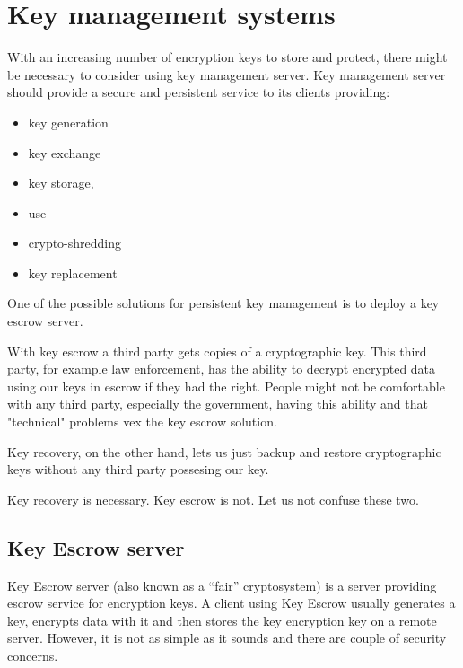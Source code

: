 \chapter{Key management systems}

With an increasing number of encryption keys to store and protect, there might be necessary to consider using key management server.
Key management server should provide a secure and persistent service to its clients providing:
\begin{itemize}
    \item key generation
    \item key exchange
    \item key storage,
    \item use
    \item crypto-shredding
    \item key replacement
\end{itemize}
One of the possible solutions for persistent key management is to deploy a key escrow server.

With key escrow a third party gets copies of a cryptographic key.
This third party, for example law enforcement, has the ability to decrypt encrypted data using our keys in escrow if they had the right.
People might not be comfortable with any third party, especially the government, having this ability and that "technical" problems vex the key escrow solution.


Key recovery, on the other hand, lets us just backup and restore cryptographic keys without any third party possesing our key.


Key recovery is necessary.
Key escrow is not.
Let us not confuse these two.

\section{Key Escrow server}\label{escrow}

Key Escrow server (also known as a “fair” cryptosystem) is a server providing escrow service for encryption keys.
A client using Key Escrow usually generates a key, encrypts data with it and then stores the key encryption key on a remote server.
However, it is not as simple as it sounds and there are couple of security concerns.

